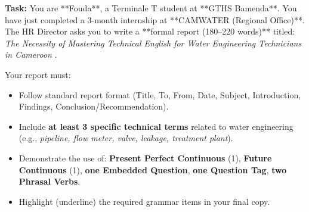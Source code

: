 \documentclass[11pt]{article}
\begin{document}
\begin{exercice}
\textbf{Task:} You are **Fouda**, a Terminale T student at **GTHS Bamenda**. You have just completed a 3-month internship at **CAMWATER (Regional Office)**. The HR Director asks you to write a **formal report (180--220 words)** titled: \og \textit{The Necessity of Mastering Technical English for Water Engineering Technicians in Cameroon} \fg.

Your report must:
\begin{itemize}
    \item Follow standard report format (Title, To, From, Date, Subject, Introduction, Findings, Conclusion/Recommendation).
    \item Include \textbf{at least 3 specific technical terms} related to water engineering (e.g., \textit{pipeline, flow meter, valve, leakage, treatment plant}).
    \item Demonstrate the use of: \textbf{Present Perfect Continuous} (1), \textbf{Future Continuous} (1), \textbf{one Embedded Question}, \textbf{one Question Tag}, \textbf{two Phrasal Verbs}.
    \item Highlight (underline) the required grammar items in your final copy.
\end{itemize}
\end{exercice}
\end{document}
